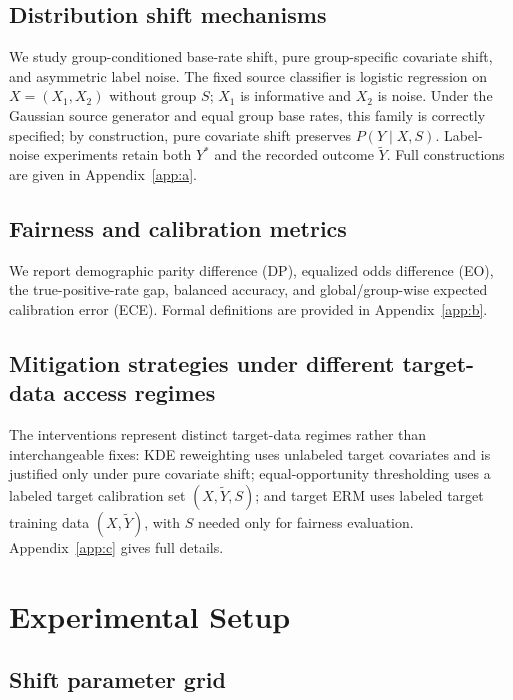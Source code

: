 \documentclass[11pt, letterpaper]{article}
\begin{document}
\subsection{Distribution shift mechanisms}
\label{sec:shift_mechanisms}

We study group-conditioned base-rate shift, pure group-specific covariate shift, and asymmetric label noise. The fixed source classifier is logistic regression on $X=(X_1,X_2)$ without group $S$; $X_1$ is informative and $X_2$ is noise. Under the Gaussian source generator and equal group base rates, this family is correctly specified; by construction, pure covariate shift preserves $P(Y\mid X,S)$. Label-noise experiments retain both $Y^*$ and the recorded outcome $\tilde{Y}$. Full constructions are given in Appendix~\ref{app:a}.

\subsection{Fairness and calibration metrics}
\label{sec:metrics}

We report demographic parity difference (DP), equalized odds difference (EO), the true-positive-rate gap, balanced accuracy, and global/group-wise expected calibration error (ECE). Formal definitions are provided in Appendix~\ref{app:b}.

\subsection{Mitigation strategies under different target-data access regimes}
\label{sec:mitigations}

The interventions represent distinct target-data regimes rather than interchangeable fixes: KDE reweighting uses unlabeled target covariates and is justified only under pure covariate shift; equal-opportunity thresholding uses a labeled target calibration set $(X,\tilde{Y},S)$; and target ERM uses labeled target training data $(X,\tilde{Y})$, with $S$ needed only for fairness evaluation. Appendix~\ref{app:c} gives full details.

\section{Experimental Setup}

\subsection{Shift parameter grid}
\label{sec:setup}
\end{document}
